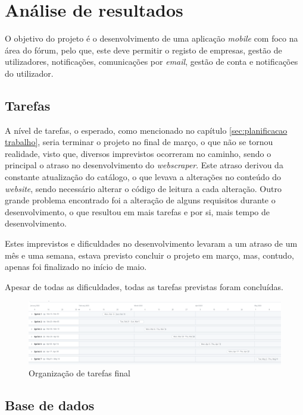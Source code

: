 \chapter{Análise de resultados}
 O objetivo do projeto é o desenvolvimento de uma aplicação \textit{mobile} com foco na área do fórum, pelo que, este deve permitir o registo de empresas, gestão de utilizadores, notificações, comunicações por \textit{email}, gestão de conta e notificações do utilizador.



 \section{Tarefas}

A nível de tarefas, o esperado, como mencionado no capítulo \ref{sec:planificacao trabalho}, seria terminar o projeto no final de março, o que não se tornou realidade, visto que, diversos imprevistos ocorreram no caminho, sendo o principal o atraso no desenvolvimento do \textit{webscraper}. Este atraso derivou da constante atualização do catálogo, o que levava a alterações no conteúdo do \textit{website}, sendo necessário alterar o código de leitura a cada alteração. Outro grande problema encontrado foi a alteração de alguns requisitos durante o desenvolvimento, o que resultou em mais tarefas e por si, mais tempo de desenvolvimento.

Estes imprevistos e dificuldades no desenvolvimento levaram a um atraso de um mês e uma semana, estava previsto concluir o projeto em março, mas, contudo, apenas foi finalizado no início de maio.

Apesar de todas as dificuldades, todas as tarefas previstas foram concluídas.

\begin{figure}[htb]
 \centering
 \includegraphics[width=\textwidth]{images/analise_resultados/planeamento_final.png}
 \caption{Organização de tarefas final}
 \label{fig:78}
\end{figure}

\newpage

\section{Base de dados}

